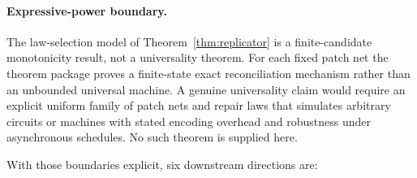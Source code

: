 \documentclass[11pt]{article}
\theoremstyle{remark}
\theoremstyle{plain}
\begin{document}
\paragraph{Expressive-power boundary.}
The law-selection model of Theorem~\ref{thm:replicator} is a finite-candidate monotonicity result,
not a universality theorem. For each fixed patch net the theorem package proves a
finite-state exact reconciliation mechanism rather than an unbounded universal machine. A genuine
universality claim would require an explicit uniform family of patch nets and repair laws that
simulates arbitrary circuits or machines with stated encoding overhead and robustness under
asynchronous schedules. No such theorem is supplied here.

With those boundaries explicit, six downstream directions are:
\end{document}
